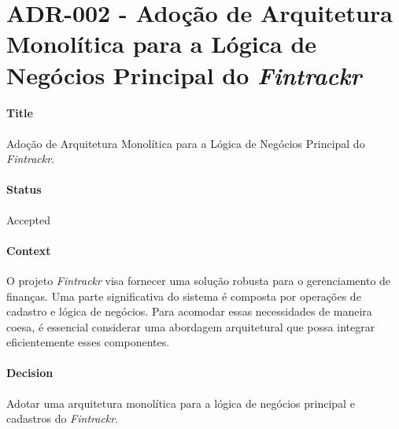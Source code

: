 
\chapter{ADR-002 - Adoção de Arquitetura Monolítica para a Lógica de Negócios Principal do \textit{Fintrackr}}
\label{apendiceADR002}

\subsubsection*{Title}
Adoção de Arquitetura Monolítica para a Lógica de Negócios Principal do \textit{Fintrackr}.

\subsubsection*{Status}
Accepted

\subsubsection*{Context}
O projeto \textit{Fintrackr} visa fornecer uma solução robusta para o gerenciamento de finanças. Uma parte significativa do sistema é composta por operações de cadastro e lógica de negócios. Para acomodar essas necessidades de maneira coesa, é essencial considerar uma abordagem arquitetural que possa integrar eficientemente esses componentes.

\subsubsection*{Decision}
Adotar uma arquitetura monolítica para a lógica de negócios principal e cadastros do \textit{Fintrackr}.

